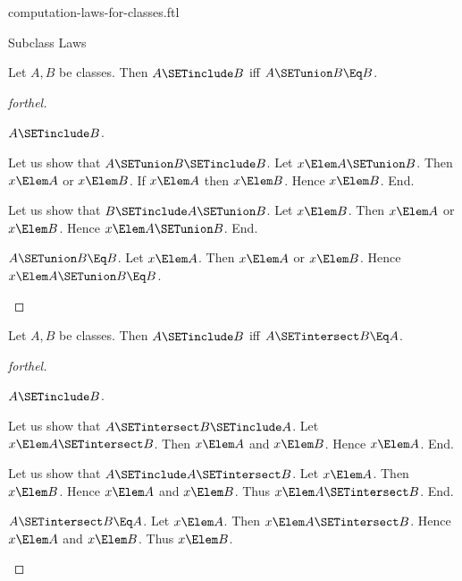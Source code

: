 \documentclass{stex}
\begin{document}
\begin{smodule}{computation-laws-for-classes.ftl}
\begin{sfragment}{Subclass Laws}
  \begin{proposition}[forthel,id=FOUNDATIONS_02_6657236858306560]
    Let $A, B$ be classes.
    Then $A \SETinclude B$ iff $A \SETunion B \Eq B$.
  \end{proposition}
  \begin{proof}[forthel]
    \begin{case}{$A \SETinclude B$.}

      Let us show that $A \SETunion B \SETinclude B$.
        Let $x \Elem A \SETunion B$.
        Then $x \Elem A$ or $x \Elem B$.
        If $x \Elem A$ then $x \Elem B$.
        Hence $x \Elem B$.
      End.

      Let us show that $B \SETinclude A \SETunion B$.
        Let $x \Elem B$.
        Then $x \Elem A$ or $x \Elem B$.
        Hence $x \Elem A \SETunion B$.
      End.
    \end{case}

    \begin{case}{$A \SETunion B \Eq B$.}
      Let $x \Elem A$.
      Then $x \Elem A$ or $x \Elem B$.
      Hence $x \Elem A \SETunion B \Eq B$.
    \end{case}
  \end{proof}

  \begin{proposition}[forthel,id=FOUNDATIONS_02_2356449346846720]
    Let $A, B$ be classes.
    Then $A \SETinclude B$ iff $A \SETintersect B \Eq A$.
  \end{proposition}
  \begin{proof}[forthel]
    \begin{case}{$A \SETinclude B$.}

      Let us show that $A \SETintersect B \SETinclude A$.
        Let $x \Elem A \SETintersect B$.
        Then $x \Elem A$ and $x \Elem B$.
        Hence $x \Elem A$.
      End.

      Let us show that $A \SETinclude A \SETintersect B$.
        Let $x \Elem A$.
        Then $x \Elem B$.
        Hence $x \Elem A$ and $x \Elem B$.
        Thus $x \Elem A \SETintersect B$.
      End.
    \end{case}

    \begin{case}{$A \SETintersect B \Eq A$.}
      Let $x \Elem A$.
      Then $x \Elem A \SETintersect B$.
      Hence $x \Elem A$ and $x \Elem B$.
      Thus $x \Elem B$.
    \end{case}
  \end{proof}
\end{sfragment}


\end{smodule}
\end{document}
